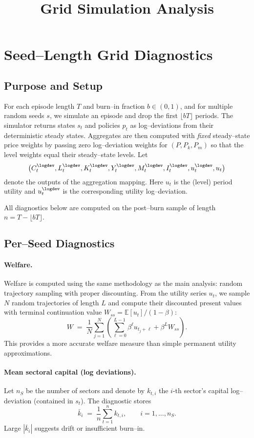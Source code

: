 \documentclass[12pt,english]{article}
\title{Grid Simulation Analysis}
\author{}
\date{}
\begin{document}
\maketitle

\section{Seed--Length Grid Diagnostics}

\subsection{Purpose and Setup}
For each episode length $T$ and burn--in fraction $b\in(0,1)$, and for multiple random seeds $s$, we simulate an episode and drop the first $\lfloor bT\rfloor$ periods. The simulator returns states $s_t$ and policies $p_t$ as log--deviations from their deterministic steady states. Aggregates are then computed with \emph{fixed} steady--state price weights by passing zero log--deviation weights for $(P, P_k, P_m)$ so that the level weights equal their steady--state levels. Let
\[\bigl(C^{\logdev}_t, L^{\logdev}_t, K^{\logdev}_t, Y^{\logdev}_t, M^{\logdev}_t, I^{\logdev}_t, u^{\logdev}_t, u_t\bigr)
\]
denote the outputs of the aggregation mapping. Here $u_t$ is the (level) period utility and $u^{\logdev}_t$ is the corresponding utility log--deviation.

All diagnostics below are computed on the post--burn sample of length $n=T-\lfloor bT\rfloor$.

\subsection{Per--Seed Diagnostics}
\paragraph{Welfare.} Welfare is computed using the same methodology as the main analysis: random trajectory sampling with proper discounting. From the utility series $u_t$, we sample $N$ random trajectories of length $L$ and compute their discounted present values with terminal continuation value $W_{ss} = \mathbb{E}[u_t]/(1-\beta)$:
\[ W \;=\; \frac{1}{N}\sum_{j=1}^{N} \left(\sum_{\ell=0}^{L-1} \beta^{\ell} u_{t_j+\ell} + \beta^L W_{ss}\right). \]
This provides a more accurate welfare measure than simple permanent utility approximations.

\paragraph{Mean sectoral capital (log deviations).} Let $n_S$ be the number of sectors and denote by $k_{t,i}$ the $i$-th sector's capital log--deviation (contained in $s_t$). The diagnostic stores
\[ \bar{k}_i \;=\; \frac{1}{n}\sum_{t=1}^{n} k_{t,i},\qquad i=1,\dots,n_S. \]
Large $|\bar{k}_i|$ suggests drift or insufficient burn--in.
\end{document}
